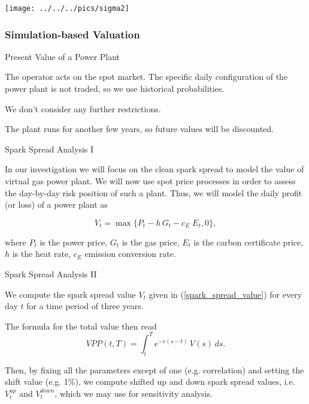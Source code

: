\begin{center}
\texttt{[image: ../../../pics/sigma2]}
\end{center}

\subsubsection{Simulation-based Valuation}

{Present Value of a Power Plant}


	The operator acts on the spot market. The specific daily configuration of the power plant is not traded, so we use historical probabilities.

	We don't consider any further restrictions.

	The plant runs for another few years, so future values will be discounted.


{Spark Spread Analysis I}

In our investigation we will focus on the clean spark spread to model the value of virtual gas power plant. We will now use spot price processes in order to assess the day-by-day risk position of such a plant. Thus, we will model the daily profit (or loss) of a power plant as

\begin{equation}
V_t = \max\{P_t - h\,G_t - c_E\;E_t, 0\},
\label{spark_spread_value}
\end{equation}

where $P_t$ is the power price, $G_t$ is the gas price, $E_t$ is the carbon certificate price, $h$ is the heat rate, $c_E$ emission conversion rate.

{Spark Spread Analysis II}


	We compute the spark spread value $V_t$ given in (\ref{spark_spread_value}) for every day $t$ for a time period of three years.

	The formula for the total value then read
$$VPP(t,T) = \int_{t}^{T}e^{-r(s-t)}\,V(s)\,ds.$$

	Then, by fixing all the parameters except of one (e.g. correlation) and setting the shift value (e.g. 1\%), we compute shifted up and down spark spread values, i.e. $V^{up}_t$ and $V^{down}_t$, which we may use for sensitivity analysis.



